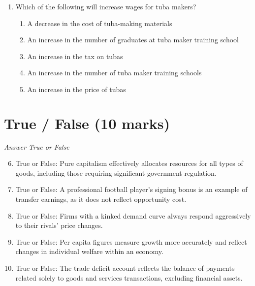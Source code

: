 \documentclass[12pt]{article}
\begin{document}
\begin{enumerate}[label=\arabic*.]
\begin{enumerate}[label=(\alph*)]
    \item Rich and poor countries will experience the same growth rates regardless of savings rates
    \item Poor countries will have fluctuating growth rates independent of savings
    \item The level of technology determines growth rates, not savings
    \item The level of income has no impact on savings
    \item Savings have no correlation with growth rates in any country
\end{enumerate}
\item Which of the following will increase wages for tuba makers?
\begin{enumerate}[label=(\alph*)]
    \item A decrease in the cost of tuba-making materials
    \item An increase in the number of graduates at tuba maker training school
    \item An increase in the tax on tubas
    \item An increase in the number of tuba maker training schools
    \item An increase in the price of tubas
\end{enumerate}
\end{enumerate}

\section*{True / False (10 marks)}
\textit{Answer True or False}
\begin{enumerate}[label=\arabic*.]
\setcounter{enumi}{5}
\item True or False: Pure capitalism effectively allocates resources for all types of goods, including those requiring significant government regulation.
\item True or False: A professional football player's signing bonus is an example of transfer earnings, as it does not reflect opportunity cost.
\item True or False: Firms with a kinked demand curve always respond aggressively to their rivals' price changes.
\item True or False: Per capita figures measure growth more accurately and reflect changes in individual welfare within an economy.
\item True or False: The trade deficit account reflects the balance of payments related solely to goods and services transactions, excluding financial assets.
\end{enumerate}
\end{document}
